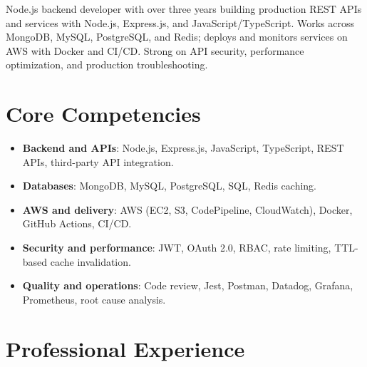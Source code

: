 \documentclass[11pt,a4paper,sans]{moderncv}
\begin{document}
\makecvtitle

\vspace{6pt}
{\small Node.js backend developer with over three years building production REST APIs and services with Node.js, Express.js, and JavaScript/TypeScript. Works across MongoDB, MySQL, PostgreSQL, and Redis; deploys and monitors services on AWS with Docker and CI/CD. Strong on API security, performance optimization, and production troubleshooting.\par}

\section{Core Competencies}
\vspace{1pt}
\begin{itemize}

\item \textbf{Backend and APIs}: Node.js, Express.js, JavaScript, TypeScript, REST APIs, third-party API integration.

\item \textbf{Databases}: MongoDB, MySQL, PostgreSQL, SQL, Redis caching.

\item \textbf{AWS and delivery}: AWS (EC2, S3, CodePipeline, CloudWatch), Docker, GitHub Actions, CI/CD.

\item \textbf{Security and performance}: JWT, OAuth 2.0, RBAC, rate limiting, TTL-based cache invalidation.

\item \textbf{Quality and operations}: Code review, Jest, Postman, Datadog, Grafana, Prometheus, root cause analysis.

\end{itemize}

\section{Professional Experience}
\vspace{3pt}
\end{document}

